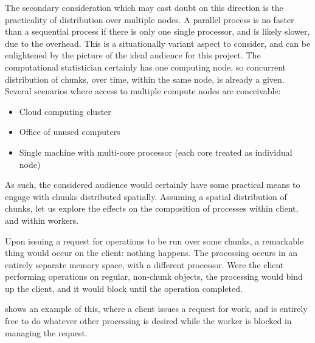 The secondary consideration which may cast doubt on this direction is the practicality of distribution over multiple nodes.
A parallel process is no faster than a sequential process if there is only one single processor, and is likely slower, due to the overhead.
This is a situationally variant aspect to consider, and can be enlightened by the picture of the ideal audience for this project.
The computational statistician certainly has one computing node, so concurrent distribution of chunks, over time, within the same node, is already a given.
Several scenarios where access to multiple compute nodes are conceivable:

\begin{itemize} \item Cloud computing cluster \item Office of unused computers \item Single machine with multi-core processor (each core treated as individual node) \end{itemize}

As such, the considered audience would certainly have some practical means to engage with chunks distributed spatially.
Assuming a spatial distribution of chunks, let us explore the effects on the composition of processes within client, and within workers.

Upon issuing a request for operations to be run over some chunks, a remarkable thing would occur on the client: nothing happens.
The processing occurs in an entirely separate memory space, with a different processor.
Were the client performing operations on regular, non-chunk objects, the processing would bind up the client, and it would block until the operation completed.

 shows an example of this, where a client issues
a request for work, and is entirely free to do whatever other processing
is desired while the worker is blocked in managing the request.


